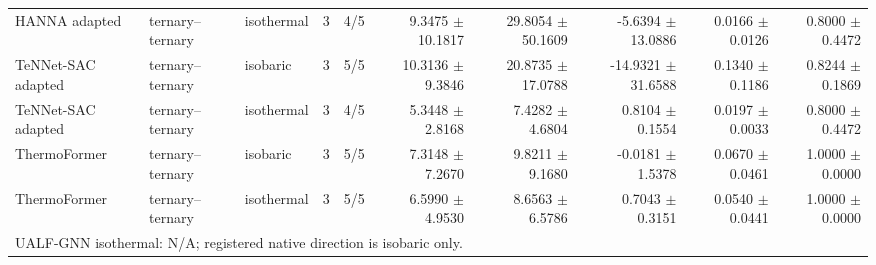 \begin{tabular}{lllllrrrrr}
HANNA adapted & ternary--ternary & isothermal & 3 & 4/5 & 9.3475 $\pm$ 10.1817 & 29.8054 $\pm$ 50.1609 & -5.6394 $\pm$ 13.0886 & 0.0166 $\pm$ 0.0126 & 0.8000 $\pm$ 0.4472 \\
TeNNet-SAC adapted & ternary--ternary & isobaric & 3 & 5/5 & 10.3136 $\pm$ 9.3846 & 20.8735 $\pm$ 17.0788 & -14.9321 $\pm$ 31.6588 & 0.1340 $\pm$ 0.1186 & 0.8244 $\pm$ 0.1869 \\
TeNNet-SAC adapted & ternary--ternary & isothermal & 3 & 4/5 & 5.3448 $\pm$ 2.8168 & 7.4282 $\pm$ 4.6804 & 0.8104 $\pm$ 0.1554 & 0.0197 $\pm$ 0.0033 & 0.8000 $\pm$ 0.4472 \\
ThermoFormer & ternary--ternary & isobaric & 3 & 5/5 & 7.3148 $\pm$ 7.2670 & 9.8211 $\pm$ 9.1680 & -0.0181 $\pm$ 1.5378 & 0.0670 $\pm$ 0.0461 & 1.0000 $\pm$ 0.0000 \\
ThermoFormer & ternary--ternary & isothermal & 3 & 5/5 & 6.5990 $\pm$ 4.9530 & 8.6563 $\pm$ 6.5786 & 0.7043 $\pm$ 0.3151 & 0.0540 $\pm$ 0.0441 & 1.0000 $\pm$ 0.0000 \\
\hline
\multicolumn{10}{l}{UALF-GNN isothermal: N/A; registered native direction is isobaric only.} \\
\end{tabular}
